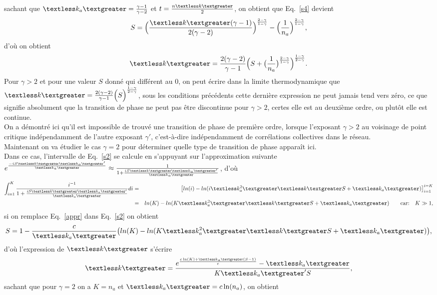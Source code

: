  sachant que $\kma=\frac{\gamma-1}{\gamma-2}$ et $t=\frac{n\km}{2}$, on obtient que Eq.~\ref{s4} devient
  \begin{equation}
  S=\Big(\frac{\km (\gamma-1)}{2(\gamma-2)}\Big)^{\frac{2-\gamma}{1-\gamma}}-\Big(\frac{1}{n_a}\Big)^{\frac{2-\gamma}{1-\gamma}},
  \label{s5}
  \end{equation}
  d'où on obtient 
    \begin{equation}
    \km=\frac{2(\gamma-2)}{\gamma-1}\Big(S+\big(\frac{1}{n_a}\big)^{\frac{2-\gamma}{1-\gamma}}\Big)^{\frac{1-\gamma}{2-\gamma}}.
    \end{equation}
  Pour $\gamma>2$ et pour une valeur $S$ donné qui différent au $0$, on peut écrire dans la limite thermodynamique que $ \km=\frac{2(\gamma-2)}{\gamma-1}\Big(S\Big)^{\frac{1-\gamma}{2-\gamma}}$, sous les conditions précédents 
  cette dernière expression ne peut jamais tend vers zéro, ce que signifie absolument que la transition de phase ne peut pas être discontinue pour $\gamma>2$, certes elle est au deuxième ordre, ou plutôt elle est continue.\\
  On a démontré ici qu'il est impossible de trouvé une transition de phase de première ordre, lorsque l'exposant $\gamma>2$ au voisinage de point critique indépendamment de l'autre exposant $\gamma'$, c'est-à-dire indépendamment de corrélations collectives dans le réseau.\\
  Maintenant on va étudier le cas $\gamma=2$ pour déterminer quelle type de transition de phase apparaît ici.\\
   Dans ce cas, l'intervalle de Eq.~\ref{s2} se calcule en s'appuyant sur l'approximation suivante  $e^{\frac{-iS\km\kma'}{\kma}}\approx \frac{1}{1+\frac{iS\km\kma'}{\kma}}$, d'où
  \begin{eqnarray}
  \int_{i=1}^K\frac{i^{-1}}{1+\frac{iS\km\kma'}{\kma}}di&=&\big[ln(i)-ln(i\kmaa\km S+\kma)\big]_{i=1}^{i=K}\nonumber\\
  &=&ln(K)-ln(K\kmaa\km S+\kma)  \quad \quad  \text{car:} \quad K\gg 1,
  \label{appr}
  \end{eqnarray}
  si on remplace Eq.~\ref{appr} dans Eq.~\ref{s2} on obtient 
  \begin{equation}
  S=1-\frac{c}{\kma}\big(ln(K)-ln(K\kmaa\km S+\kma)\big),
  \end{equation}
  d'où l'expression de $\km$ s'écrire
  \begin{equation}
 \km=\frac{e^{\frac{c\ln(K)+\kma(S-1)}{c}}-\kma}{K\kma' S},
  \end{equation}
 sachant que pour $\gamma=2$ on a $K=n_a$ et $\kma=c\ln(n_a)$, on obtient
